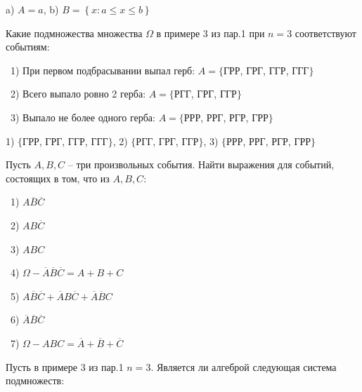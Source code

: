\begin{result}
a) $A = a$, b) $B = \left\{x: a \le x \le b\right\}$
\end{result}


\medskip
\begin{task}{5}
Какие подмножества множества $\Omega$ в примере 3 из пар.1 при $n = 3$ соответствуют событиям:
\end{task}

\begin{solution}
\par\smallskip
\noindent~1) При первом подбрасывании выпал герб: $A = \{$ГРР, ГРГ, ГГР, ГГГ$\}$

\medskip
\noindent~2) Всего выпало ровно 2 герба: $A = \{$РГГ, ГРГ, ГГР$\}$

\medskip
\noindent~3) Выпало не более одного герба: $A = \{$РРР, РРГ, РГР, ГРР$\}$
\end{solution}

\begin{result}
  1) $\{$ГРР, ГРГ, ГГР, ГГГ$\}$, 2) $\{$РГГ, ГРГ, ГГР$\}$, 3) $\{$РРР, РРГ, РГР, ГРР$\}$
\end{result}


\medskip
\begin{task}{6}
Пусть $A, B, C$ -- три произвольных события. Найти выражения для событий, состоящих
в том, что из $A, B, C$:
\end{task}

\begin{solution}

\smallskip
\noindent~1) $A\overline{B}\overline{C}$

\smallskip
\noindent~2) $AB\overline{C}$

\smallskip
\noindent~3) $ABC$ 

\smallskip
\noindent~4) $\Omega - \overline{A}\overline{B}\overline{C} = A + B + C$

\smallskip
\noindent~5) $A\overline{B}\overline{C} + \overline{A}B\overline{C} + \overline{A}\overline{B}C$

\smallskip
\noindent~6) $\overline{A}\overline{B}\overline{C}$

\smallskip
\noindent~7) $\Omega - ABC = \overline{A} + \overline{B} + \overline{C}$
\end{solution}


\medskip
\begin{task}{7}
Пусть в примере 3 из пар.1 $n = 3$. Является ли алгеброй следующая система подмножеств:
\end{task}

